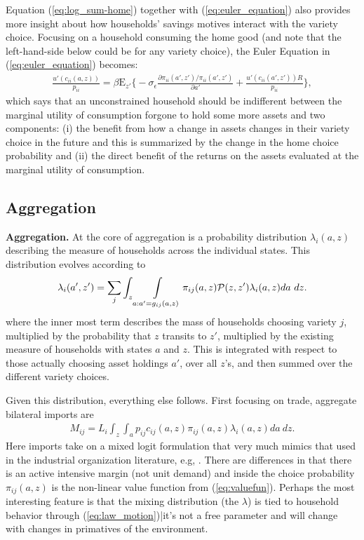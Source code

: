 \documentclass[12pt,pdftex]{article}
\begin{document}
\begin{onehalfspacing}
Equation (\ref{eq:log_sum-home}) together with (\ref{eq:euler_equation}) also provides more insight about how households' savings motives interact with the variety choice. Focusing on a household consuming the home good (and note that the left-hand-side below could be for any variety choice), the Euler Equation in (\ref{eq:euler_equation}) becomes:
\begin{align}
\frac{u'(c_{ii}(a,z))}{p_{ii}} = \beta \mathrm{E}_{z'} \bigg \{ -\sigma_{\epsilon} \frac{\partial \pi_{ii}(a',z') / \pi_{ii}(a',z')}{\partial a'} + \frac{u'(c_{ii}(a',z'))R}{p_{ii}} \bigg \},
\label{eq:euler_equation-home}
\end{align}
which says that an unconstrained household should be indifferent between the marginal utility of consumption forgone to hold some more assets and two components: (i) the benefit from how a change in assets changes in their variety choice in the future and this is summarized by the change in the home choice probability and (ii) the direct benefit of the returns on the assets evaluated at the marginal utility of consumption.

\subsection{Aggregation}

\textbf{Aggregation.} At the core of aggregation is a probability distribution $\lambda_{i}(a, z)$ describing the measure of households across the individual states. This distribution evolves according to
\begin{align}
\lambda_i(a', z') = \sum_{j} \int_{z}\int\displaylimits_{a: a' = g_{ij}(a, z)} \pi_{ij}(a, z) \mathcal{P}(z, z') \lambda_i(a, z) da \ dz.
\label{eq:law_motion}
\end{align}
where the inner most term describes the mass of households choosing variety $j$, multiplied by the probability that $z$ transits to $z'$, multiplied by the existing measure of households with states $a$ and $z$. This is integrated with respect to those actually choosing asset holdings $a'$, over all $z$'s, and then summed over the different variety choices.

Given this distribution, everything else follows. First focusing on trade, aggregate bilateral imports are
\begin{align}
M_{ij} = L_i \int_{z} \int_{a}  p_{ij} c_{ij}(a, z) \pi_{ij}(a, z) \lambda_i(a, z)da \ dz.
\label{eq:imports}
\end{align}
Here imports take on a mixed logit formulation that very much mimics that used in the industrial organization literature, e.g, \citet*{berry1995automobile}.  There are differences in that there is an active intensive margin (not unit demand) and inside the choice probability $\pi_{ij}(a, z)$ is the non-linear value function from (\ref{eq:valuefun}). Perhaps the most interesting feature is that the mixing distribution (the $\lambda$) is tied to household behavior through (\ref{eq:law_motion})|it's not a free parameter and will change with changes in primatives of the environment.


\end{onehalfspacing}
\end{document}
